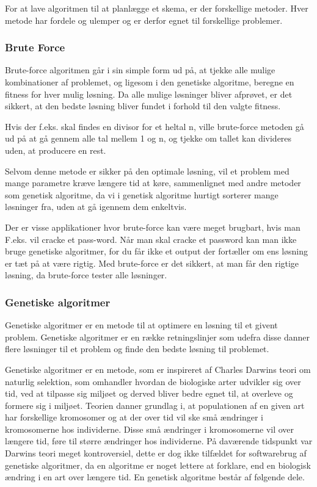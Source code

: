 

For at lave algoritmen til at planlægge et skema, er der forskellige metoder. Hver metode har fordele og ulemper og er derfor egnet til forskellige problemer.

\subsubsection{Brute Force}

Brute-force algoritmen går i sin simple form ud på, at tjekke alle mulige kombinationer af problemet, og ligesom i den genetiske algoritme, beregne en fitness for hver mulig løsning. Da alle mulige løsninger bliver afprøvet, er det sikkert, at den bedste løsning bliver fundet i forhold til den valgte fitness. 

Hvis der f.eks. skal findes en divisor for et heltal n, ville brute-force metoden gå ud på at gå gennem alle tal mellem 1 og n, og tjekke om tallet kan divideres uden, at producere en rest.

Selvom denne metode er sikker på den optimale løsning, vil et problem med mange parametre kræve længere tid at køre, sammenlignet med andre metoder som genetisk algoritme, da vi i genetisk algoritme hurtigt sorterer mange løsninger fra, uden at gå igennem dem enkeltvis.

Der er visse applikationer hvor brute-force kan være meget brugbart, hvis man F.eks. vil cracke et pass-word. Når man skal cracke et password kan man ikke bruge genetiske algoritmer, for du får ikke et output der fortæller om ens løsning er tæt på at være rigtig. Med brute-force er det sikkert, at man får den rigtige løsning, da brute-force tester alle løsninger.

\subsubsection{Genetiske algoritmer}
Genetiske algoritmer er en metode til at optimere en løsning til et givent problem. Genetiske algoritmer er en række retningslinjer som udefra disse danner flere løsninger til et problem og finde den bedste løsning til problemet.

Genetiske algoritmer er en metode, som er inspireret af Charles Darwins teori om naturlig selektion, som omhandler hvordan de biologiske arter udvikler sig over tid, ved at tilpasse sig miljøet og derved bliver bedre egnet til, at overleve og formere sig i miljøet. Teorien danner grundlag i, at populationen af en given art har forskellige kromosomer og at der over tid vil ske små ændringer i kromosomerne hos individerne. Disse små ændringer i kromosomerne vil over længere tid, føre til større ændringer hos individerne. På daværende tidspunkt var Darwins teori meget kontroversiel, dette er dog ikke tilfældet for softwarebrug af genetiske algoritmer, da en algoritme er noget lettere at forklare, end en biologisk ændring i en art over længere tid.
En genetisk algoritme består af følgende dele.


